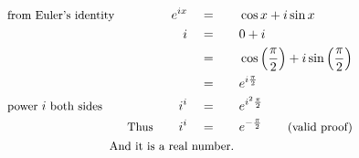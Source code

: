 \begin{alignat*}{5}
&\small\text{from Euler's identity}&e^{ix}\quad&=\quad&&\cos{x}+i\sin{x}\\
&\,&i\quad&=&&0+i\\
&\,&\,&=&&\cos{\left(\frac{\pi}{2}\right)}+i\sin{\left(\frac{\pi}{2}\right)}\\
&\,&\,&=&&e^{i\frac{\pi}{2}}\\
&\small\text{power }i\text{ both sides}&i^i\quad&=&& e^{i^2\frac{\pi}{2}}\\
&\,&\small\text{Thus}\normalsize\qquad i^i\quad&=&&e^{-\frac{\pi}{2}}\qquad\small\text{(valid proof)}\\
&\rlap{\qquad\qquad\qquad\qquad\small\text{And it is a real number.}}
\end{alignat*}
